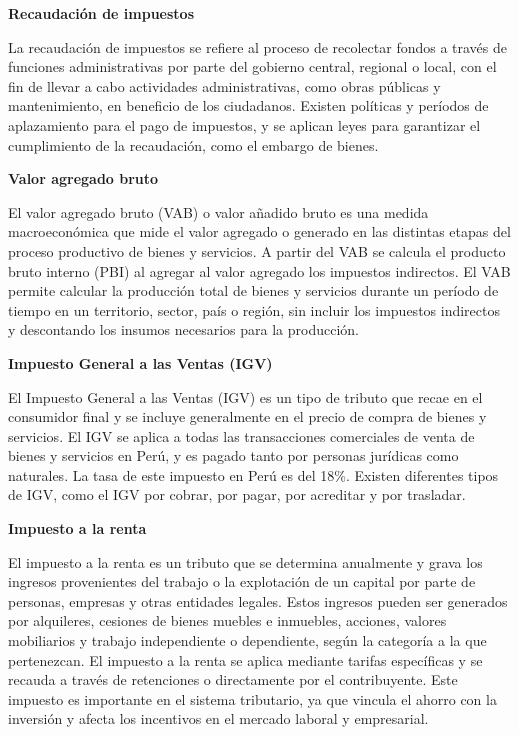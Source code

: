 \documentclass[
  letterpaper,
  DIV=11,
  numbers=noendperiod]{scrartcl}
\begin{document}
\textbf{Recaudación de impuestos}

La recaudación de impuestos se refiere al proceso de recolectar fondos a
través de funciones administrativas por parte del gobierno central,
regional o local, con el fin de llevar a cabo actividades
administrativas, como obras públicas y mantenimiento, en beneficio de
los ciudadanos. Existen políticas y períodos de aplazamiento para el
pago de impuestos, y se aplican leyes para garantizar el cumplimiento de
la recaudación, como el embargo de bienes.

\textbf{Valor agregado bruto}

El valor agregado bruto (VAB) o valor añadido bruto es una medida
macroeconómica que mide el valor agregado o generado en las distintas
etapas del proceso productivo de bienes y servicios. A partir del VAB se
calcula el producto bruto interno (PBI) al agregar al valor agregado los
impuestos indirectos. El VAB permite calcular la producción total de
bienes y servicios durante un período de tiempo en un territorio,
sector, país o región, sin incluir los impuestos indirectos y
descontando los insumos necesarios para la producción.

\textbf{Impuesto General a las Ventas (IGV)}

El Impuesto General a las Ventas (IGV) es un tipo de tributo que recae
en el consumidor final y se incluye generalmente en el precio de compra
de bienes y servicios. El IGV se aplica a todas las transacciones
comerciales de venta de bienes y servicios en Perú, y es pagado tanto
por personas jurídicas como naturales. La tasa de este impuesto en Perú
es del 18\%. Existen diferentes tipos de IGV, como el IGV por cobrar,
por pagar, por acreditar y por trasladar.

\textbf{Impuesto a la renta}

El impuesto a la renta es un tributo que se determina anualmente y grava
los ingresos provenientes del trabajo o la explotación de un capital por
parte de personas, empresas y otras entidades legales. Estos ingresos
pueden ser generados por alquileres, cesiones de bienes muebles e
inmuebles, acciones, valores mobiliarios y trabajo independiente o
dependiente, según la categoría a la que pertenezcan. El impuesto a la
renta se aplica mediante tarifas específicas y se recauda a través de
retenciones o directamente por el contribuyente. Este impuesto es
importante en el sistema tributario, ya que vincula el ahorro con la
inversión y afecta los incentivos en el mercado laboral y empresarial.
\end{document}
